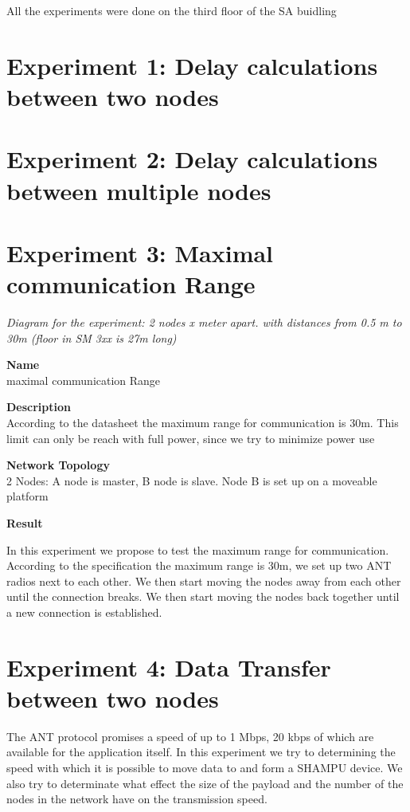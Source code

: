 All the experiments were done on the third floor of the SA buidling
\newpage

\section{Experiment 1: Delay calculations between two nodes}
\newpage

\section{Experiment 2: Delay calculations between multiple nodes}
\newpage

\section{Experiment 3: Maximal communication Range}
\textit{Diagram for the experiment:  2 nodes   x meter apart.  with distances from 0.5 m to 30m  (floor in SM 3xx is 27m long)}
\begin{description} 
\item{\textbf{Name}} \hfill \\ maximal communication Range
\item{\textbf{Description}} \hfill \\ According to the datasheet the maximum range for communication is 30m. This limit can only be reach with full power, since we try to minimize power use
\item{\textbf{Network Topology}} \hfill \\ 2 Nodes: A node is master, B node is slave. Node B is set up on a moveable platform 
\item{\textbf{Result}} \hfill \\ 
\end{description}
In this experiment we propose to test the maximum range for communication. According to the specification the maximum range is 30m, we set up two ANT radios next to each other. We then start moving the nodes away from each other until the connection breaks. We then start moving the nodes back together until a new connection is established.
\newpage

\section{Experiment 4: Data Transfer between two nodes}
The ANT protocol promises a speed of up to 1 Mbps, 20 kbps of which are available for the application itself. In this experiment we try to determining the speed with which it is possible to move data to and form a SHAMPU device. We also try to determinate what effect the size of the payload and the number of the nodes in the network have on the transmission speed.
\newpage

